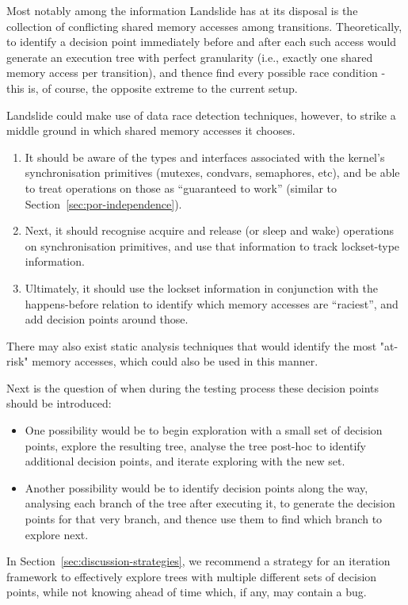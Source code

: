 Most notably among the information Landslide has at its disposal is the collection of conflicting shared memory accesses among transitions. Theoretically, to identify a decision point immediately before and after each such access would generate an execution tree with perfect granularity (i.e., exactly one shared memory access per transition), and thence find every possible race condition - this is, of course, the opposite extreme to the current setup.

Landslide could make use of data race detection techniques\cite{datacollider}, however, to strike a middle ground in which shared memory accesses it chooses.
\begin{enumerate}
	\item It should be aware of the types and interfaces associated with the kernel's synchronisation primitives (mutexes, condvars, semaphores, etc), and be able to treat operations on those as ``guaranteed to work'' (similar to Section~\ref{sec:por-independence}).
	\item Next, it should recognise acquire and release (or sleep and wake) operations on synchronisation primitives, and use that information to track lockset-type information.
	\item Ultimately, it should use the lockset information in conjunction with the happens-before relation to identify which memory accesses are ``raciest'', and add decision points around those.
\end{enumerate}

There may also exist static analysis techniques that would identify the most "at-risk" memory accesses, which could also be used in this manner.

Next is the question of when during the testing process these decision points should be introduced:

\begin{itemize}
	\item One possibility would be to begin exploration with a small set of decision points, explore the resulting tree, analyse the tree post-hoc to identify additional decision points, and iterate exploring with the new set.
	\item Another possibility would be to identify decision points along the way, analysing each branch of the tree after executing it, to generate the decision points for that very branch, and thence use them to find which branch to explore next.
\end{itemize}

In Section~\ref{sec:discussion-strategies}, we recommend a strategy for an iteration framework to effectively explore trees with multiple different sets of decision points, while not knowing ahead of time which, if any, may contain a bug.

